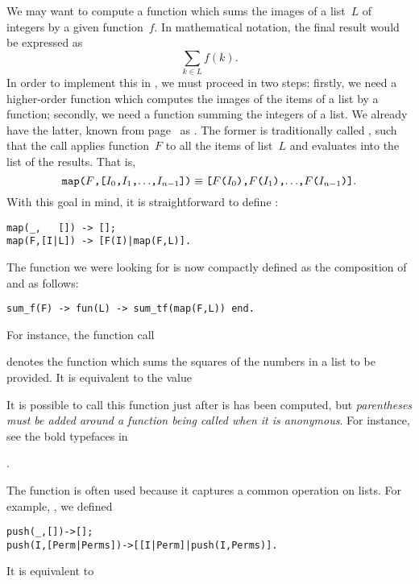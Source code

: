 We may want to compute a function which sums the images of a
list~\(L\) of integers by a given function~\(f\). In mathematical
notation, the final result would be expressed as
\[
\sum_{k \in L}{f(k)}.
\]
In order to implement this in \Erlang, we must proceed in two steps:
firstly, we need a higher\hyp{}order function which computes the
images of the items of a list by a function; secondly, we need a
function summing the integers of a list. We already have the latter,
known from page~\pageref{code:sum_tf_repeated} as
. The former is traditionally called
, such that the call  applies
function~\(F\) to all the items of list~\(L\) and evaluates into the
list of the results. That is,
\[
\texttt{map(\(F\),[\(I_0\),\(I_1\),\(\ldots\),\(I_{n-1}\)])}
\mathrel{\equiv}
\texttt{[\(F\)(\(I_0\)),\(F\)(\(I_1\)),\(\ldots\),\(F\)(\(I_{n-1}\))]}.
\]
With this goal in mind, it is straightforward to define :
\begin{verbatim}
map(_,   []) -> [];
map(F,[I|L]) -> [F(I)|map(F,L)].
\end{verbatim}
The function we were looking for is now compactly defined as the
composition of  and  as follows:
\begin{verbatim}
sum_f(F) -> fun(L) -> sum_tf(map(F,L)) end.
\end{verbatim}
For instance, the function call
\begin{center}
\end{center}
denotes the function which sums the squares of the numbers in a list
to be provided. It is equivalent to the value
\begin{center}
\end{center}
It is possible to call this function just after is has been computed,
but \emph{parentheses must be added around a function being called
  when it is anonymous}. For instance, see the bold typefaces in
\begin{center}
.
\end{center}
The function  is often used because it captures a
common operation on lists. For example, , we
defined
\begin{alltt}
push(_,          []) -> [];
push(I,[Perm|Perms]) -> [[I|Perm]|push(I,Perms)].
\end{alltt}
It is equivalent to

